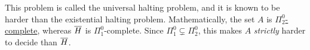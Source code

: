 \begin{solution}
\begin{enumerate}
This problem is called the universal halting problem,
and it is known to be harder than the existential halting problem.
Mathematically, the set \(A\) is \href{https://en.wikipedia.org/wiki/Arithmetical_hierarchy}{\(\Pi_2^0\)-complete},
whereas \(\overline{H}\) is \(\Pi_1^0\)-complete.
Since \(\Pi_1^0 \subsetneq \Pi_2^0\),
this makes \(A\) \emph{strictly} harder to decide than \(\overline{H}\).
\end{enumerate}
\end{solution}
